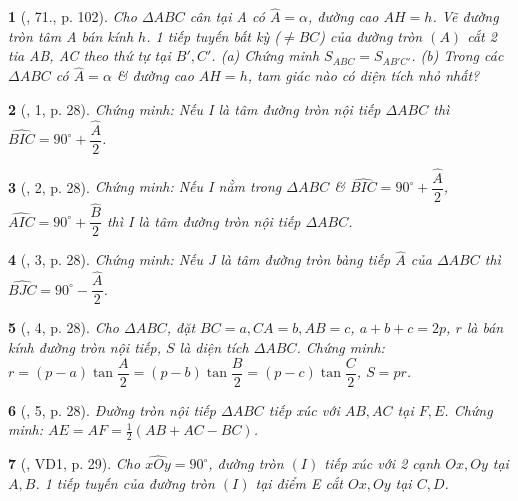 \documentclass{article}
\newtheorem{baitoan}{}
\begin{document}
\begin{baitoan}[\cite{Binh_Toan_9_tap_1}, 71., p. 102]
	Cho $\Delta ABC$ cân tại A có $\widehat{A} = \alpha$, đường cao $AH = h$. Vẽ đường tròn tâm A bán kính $h$. 1 tiếp tuyến bất kỳ ($\ne BC$) của đường tròn $(A)$ cắt 2 tia AB, AC theo thứ tự tại $B',C'$. (a) Chứng minh $S_{ABC} = S_{AB'C'}$. (b) Trong các $\Delta ABC$ có $\widehat{A} = \alpha$ \& đường cao $AH = h$, tam giác nào có diện tích nhỏ nhất?
\end{baitoan}

\begin{baitoan}[\cite{TLCT_THCS_Toan_9_hinh_hoc}, 1, p. 28]
	Chứng minh: Nếu I là tâm đường tròn nội tiếp $\Delta ABC$ thì $\widehat{BIC} = 90^\circ + \dfrac{\widehat{A}}{2}$.
\end{baitoan}

\begin{baitoan}[\cite{TLCT_THCS_Toan_9_hinh_hoc}, 2, p. 28]
	Chứng minh: Nếu I nằm trong $\Delta ABC$ \& $\widehat{BIC} = 90^\circ + \dfrac{\widehat{A}}{2}$, $\widehat{AIC} = 90^\circ + \dfrac{\widehat{B}}{2}$ thì I là tâm đường tròn nội tiếp $\Delta ABC$.
\end{baitoan}

\begin{baitoan}[\cite{TLCT_THCS_Toan_9_hinh_hoc}, 3, p. 28]
	Chứng minh: Nếu J là tâm đường tròn bàng tiếp $\widehat{A}$ của $\Delta ABC$ thì $\widehat{BJC} = 90^\circ - \dfrac{\widehat{A}}{2}$.
\end{baitoan}

\begin{baitoan}[\cite{TLCT_THCS_Toan_9_hinh_hoc}, 4, p. 28]
	Cho $\Delta ABC$, đặt $BC = a,CA = b,AB = c$, $a + b + c = 2p$, $r$ là bán kính đường tròn nội tiếp, $S$ là diện tích $\Delta ABC$. Chứng minh: $r = (p - a)\tan\dfrac{A}{2} = (p - b)\tan\dfrac{B}{2} = (p - c)\tan\dfrac{C}{2}$, $S = pr$.
\end{baitoan}

\begin{baitoan}[\cite{TLCT_THCS_Toan_9_hinh_hoc}, 5, p. 28]
	Đường tròn nội tiếp $\Delta ABC$ tiếp xúc với $AB,AC$ tại $F,E$. Chứng minh: $AE = AF = \frac{1}{2}(AB + AC - BC)$.
\end{baitoan}

\begin{baitoan}[\cite{TLCT_THCS_Toan_9_hinh_hoc}, VD1, p. 29]
	Cho $\widehat{xOy} = 90^\circ$, đường tròn $(I)$ tiếp xúc với 2 cạnh $Ox,Oy$ tại $A,B$. 1 tiếp tuyến của đường tròn $(I)$ tại điểm E cắt $Ox,Oy$ tại $C,D$.
\end{baitoan}
\end{document}
